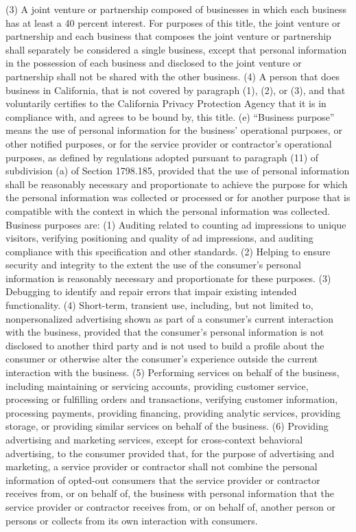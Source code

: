 (3) A joint venture or partnership composed of businesses in which each business has at least a 40 percent interest. For purposes of this title, the joint venture or partnership and each business that composes the joint venture or partnership shall separately be considered a single business, except that personal information in the possession of each business and disclosed to the joint venture or partnership shall not be shared with the other business.
(4) A person that does business in California, that is not covered by paragraph (1), (2), or (3), and that voluntarily certifies to the California Privacy Protection Agency that it is in compliance with, and agrees to be bound by, this title.
(e) “Business purpose” means the use of personal information for the business’ operational purposes, or other notified purposes, or for the service provider or contractor’s operational purposes, as defined by regulations adopted pursuant to paragraph (11) of subdivision (a) of Section 1798.185, provided that the use of personal information shall be reasonably necessary and proportionate to achieve the purpose for which the personal information was collected or processed or for another purpose that is compatible with the context in which the personal information was collected. Business purposes are:
(1) Auditing related to counting ad impressions to unique visitors, verifying positioning and quality of ad impressions, and auditing compliance with this specification and other standards.
(2) Helping to ensure security and integrity to the extent the use of the consumer’s personal information is reasonably necessary and proportionate for these purposes.
(3) Debugging to identify and repair errors that impair existing intended functionality.
(4) Short-term, transient use, including, but not limited to, nonpersonalized advertising shown as part of a consumer’s current interaction with the business, provided that the consumer’s personal information is not disclosed to another third party and is not used to build a profile about the consumer or otherwise alter the consumer’s experience outside the current interaction with the business.
(5) Performing services on behalf of the business, including maintaining or servicing accounts, providing customer service, processing or fulfilling orders and transactions, verifying customer information, processing payments, providing financing, providing analytic services, providing storage, or providing similar services on behalf of the business.
(6) Providing advertising and marketing services, except for cross-context behavioral advertising, to the consumer provided that, for the purpose of advertising and marketing, a service provider or contractor shall not combine the personal information of opted-out consumers that the service provider or contractor receives from, or on behalf of, the business with personal information that the service provider or contractor receives from, or on behalf of, another person or persons or collects from its own interaction with consumers.
